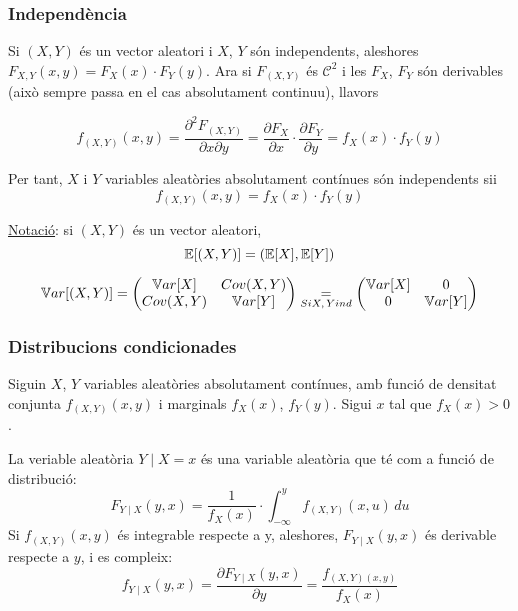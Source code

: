\subsubsection{Independència}

Si $(X,Y)$ és un vector aleatori i $X$, $Y$ són independents, aleshores $F_{X,Y}(x,y) = F_{X}(x)\cdot F_{Y}(y)$. Ara si $F_{(X,Y)}$ és $\mathcal{C}^{2}$ i les $F_{X}$, $F_{Y}$ són derivables (això sempre passa en el cas absolutament continuu), llavors

\[
  f_{(X,Y)}(x,y) = \frac{\partial^{2}F_{(X,Y)}}{\partial x \partial y} = \frac{\partial F_{X}}{\partial x}\cdot \frac{\partial F_{Y}}{\partial y} = f_{X}(x) \cdot f_{Y}(y)
\]

Per tant, $X$ i $Y$ variables aleatòries absolutament contínues són independents sii
\[
  f_{(X,Y)}(x,y) = f_{X}(x)\cdot f_{Y}(y)
\]

\underline{Notació}: si $(X,Y)$ és un vector aleatori, 
\[
  \mathbb{E}[(X,Y)] = (\mathbb{E}[X], \mathbb{E}[Y])
\]

\[
  \mathbb{V} ar[(X,Y)] = 
  \begin{pmatrix}
    \mathbb{V} ar[X]  &  Cov(X,Y) \\
    Cov(X,Y)  &  \mathbb{V} ar[Y]
  \end{pmatrix}
  \underset{Si X,\, Y ind}{=}
  \begin{pmatrix}
    \mathbb{V} ar[X]  &  0 \\
    0         &  \mathbb{V} ar[Y]
  \end{pmatrix}
\]

\subsubsection{Distribucions condicionades}

Siguin $X$, $Y$ variables aleatòries absolutament contínues, amb funció de densitat conjunta $f_{(X,Y)}(x,y)$ i marginals $f_{X}(x)$, $f_{Y}(y)$. Sigui $x$ tal que $f_{X}(x) > 0$.

\begin{defi}
  La veriable aleatòria $Y \mid X = x$ és una variable aleatòria que té com a funció de distribució:
  \[
    F_{Y\mid X}(y,x) = \frac{1}{f_{X}(x)} \cdot \int_{-\infty}^{y}f_{(X,Y)}(x,u) \, du
  \]
  Si $f_{(X,Y)}(x,y)$ és integrable respecte a y, aleshores, $F_{Y \mid X}(y,x)$ és derivable respecte a $y$, i es compleix:
  \[
    f_{Y\mid X}(y,x) = \frac{\partial F_{Y\mid X}(y,x)}{\partial y} = \frac{f_{(X,Y)(x,y)}}{f_{X}(x)}
  \]
\end{defi}

